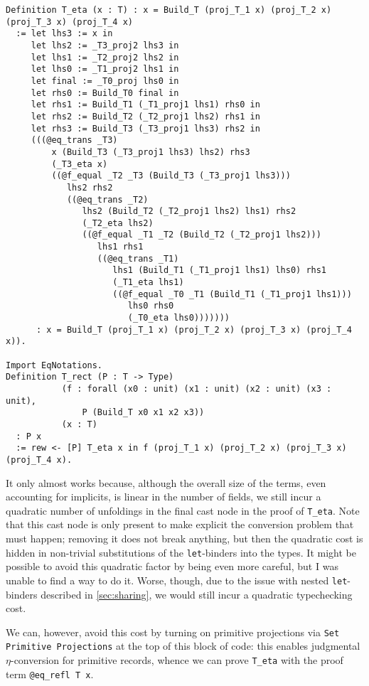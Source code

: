 \begin{verbatim}
Definition T_eta (x : T) : x = Build_T (proj_T_1 x) (proj_T_2 x) (proj_T_3 x) (proj_T_4 x)
  := let lhs3 := x in
     let lhs2 := _T3_proj2 lhs3 in
     let lhs1 := _T2_proj2 lhs2 in
     let lhs0 := _T1_proj2 lhs1 in
     let final := _T0_proj lhs0 in
     let rhs0 := Build_T0 final in
     let rhs1 := Build_T1 (_T1_proj1 lhs1) rhs0 in
     let rhs2 := Build_T2 (_T2_proj1 lhs2) rhs1 in
     let rhs3 := Build_T3 (_T3_proj1 lhs3) rhs2 in
     (((@eq_trans _T3)
         x (Build_T3 (_T3_proj1 lhs3) lhs2) rhs3
         (_T3_eta x)
         ((@f_equal _T2 _T3 (Build_T3 (_T3_proj1 lhs3)))
            lhs2 rhs2
            ((@eq_trans _T2)
               lhs2 (Build_T2 (_T2_proj1 lhs2) lhs1) rhs2
               (_T2_eta lhs2)
               ((@f_equal _T1 _T2 (Build_T2 (_T2_proj1 lhs2)))
                  lhs1 rhs1
                  ((@eq_trans _T1)
                     lhs1 (Build_T1 (_T1_proj1 lhs1) lhs0) rhs1
                     (_T1_eta lhs1)
                     ((@f_equal _T0 _T1 (Build_T1 (_T1_proj1 lhs1)))
                        lhs0 rhs0
                        (_T0_eta lhs0)))))))
      : x = Build_T (proj_T_1 x) (proj_T_2 x) (proj_T_3 x) (proj_T_4 x)).

Import EqNotations.
Definition T_rect (P : T -> Type)
           (f : forall (x0 : unit) (x1 : unit) (x2 : unit) (x3 : unit),
               P (Build_T x0 x1 x2 x3))
           (x : T)
  : P x
  := rew <- [P] T_eta x in f (proj_T_1 x) (proj_T_2 x) (proj_T_3 x) (proj_T_4 x).
\end{verbatim}
  It only almost works because, although the overall size of the terms, even accounting for implicits, is linear in the number of fields, we still incur a quadratic number of unfoldings in the final cast node in the proof of \texttt{T_eta}.
  Note that this cast node is only present to make explicit the conversion problem that must happen; removing it does not break anything, but then the quadratic cost is hidden in non-trivial substitutions of the \texttt{let}-binders into the types.
  It might be possible to avoid this quadratic factor by being even more careful, but I was unable to find a way to do it.
  Worse, though, due to the issue with nested \texttt{let}-binders described in \autoref{sec:sharing}, we would still incur a quadratic typechecking cost.
  
  We can, however, avoid this cost by turning on primitive projections via \texttt{Set Primitive Projections} at the top of this block of code:
  this enables judgmental $\eta$-conversion for primitive records, whence we can prove \texttt{T_eta} with the proof term \texttt{@eq_refl T x}.
  

